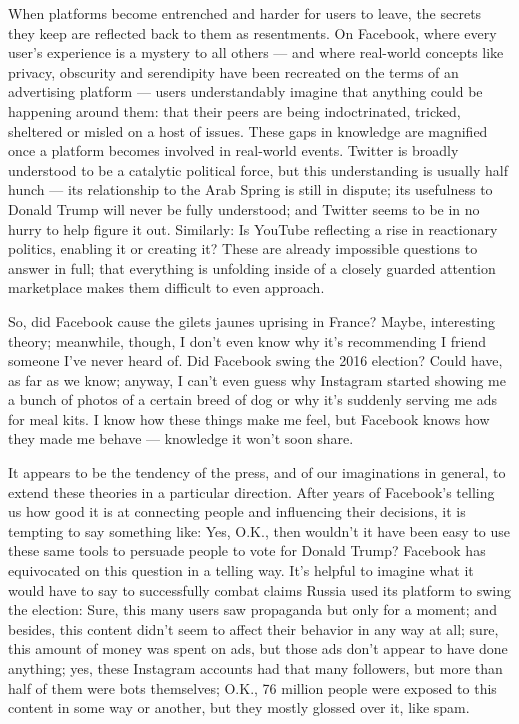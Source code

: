 When platforms become entrenched and harder for users to leave, the
secrets they keep are reflected back to them as resentments. On
Facebook, where every user's experience is a mystery to all others ---
and where real-world concepts like privacy, obscurity and serendipity
have been recreated on the terms of an advertising platform --- users
understandably imagine that anything could be happening around them:
that their peers are being indoctrinated, tricked, sheltered or misled
on a host of issues. These gaps in knowledge are magnified once a
platform becomes involved in real-world events. Twitter is broadly
understood to be a catalytic political force, but this understanding is
usually half hunch --- its relationship to the Arab Spring is still in
dispute; its usefulness to Donald Trump will never be fully understood;
and Twitter seems to be in no hurry to help figure it out. Similarly: Is
YouTube reflecting a rise in reactionary politics, enabling it or
creating it? These are already impossible questions to answer in full;
that everything is unfolding inside of a closely guarded attention
marketplace makes them difficult to even approach.

So, did Facebook cause the gilets jaunes uprising in France? Maybe,
interesting theory; meanwhile, though, I don't even know why it's
recommending I friend someone I've never heard of. Did Facebook swing
the 2016 election? Could have, as far as we know; anyway, I can't even
guess why Instagram started showing me a bunch of photos of a certain
breed of dog or why it's suddenly serving me ads for meal kits. I know
how these things make me feel, but Facebook knows how they made me
behave --- knowledge it won't soon share.

It appears to be the tendency of the press, and of our imaginations in
general, to extend these theories in a particular direction. After years
of Facebook's telling us how good it is at connecting people and
influencing their decisions, it is tempting to say something like: Yes,
O.K., then wouldn't it have been easy to use these same tools to
persuade people to vote for Donald Trump? Facebook has equivocated on
this question in a telling way. It's helpful to imagine what it would
have to say to successfully combat claims Russia used its platform to
swing the election: Sure, this many users saw propaganda but only for a
moment; and besides, this content didn't seem to affect their behavior
in any way at all; sure, this amount of money was spent on ads, but
those ads don't appear to have done anything; yes, these Instagram
accounts had that many followers, but more than half of them were bots
themselves; O.K., 76 million people were exposed to this content in some
way or another, but they mostly glossed over it, like spam.


